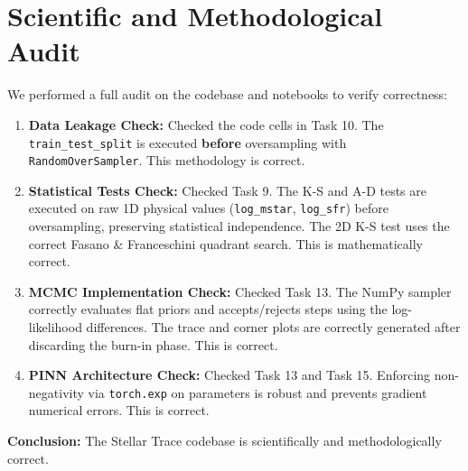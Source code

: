 \documentclass[11pt,a4paper]{article}
\begin{document}
\section{Scientific and Methodological Audit}
We performed a full audit on the codebase and notebooks to verify correctness:
\begin{enumerate}
    \item \textbf{Data Leakage Check:} Checked the code cells in Task 10. The \texttt{train\_test\_split} is executed \textbf{before} oversampling with \texttt{RandomOverSampler}. This methodology is correct.
    \item \textbf{Statistical Tests Check:} Checked Task 9. The K-S and A-D tests are executed on raw 1D physical values (\texttt{log\_mstar}, \texttt{log\_sfr}) before oversampling, preserving statistical independence. The 2D K-S test uses the correct Fasano \& Franceschini quadrant search. This is mathematically correct.
    \item \textbf{MCMC Implementation Check:} Checked Task 13. The NumPy sampler correctly evaluates flat priors and accepts/rejects steps using the log-likelihood differences. The trace and corner plots are correctly generated after discarding the burn-in phase. This is correct.
    \item \textbf{PINN Architecture Check:} Checked Task 13 and Task 15. Enforcing non-negativity via \texttt{torch.exp} on parameters is robust and prevents gradient numerical errors. This is correct.
\end{enumerate}
\textbf{Conclusion:} The Stellar Trace codebase is scientifically and methodologically correct.
\end{document}
